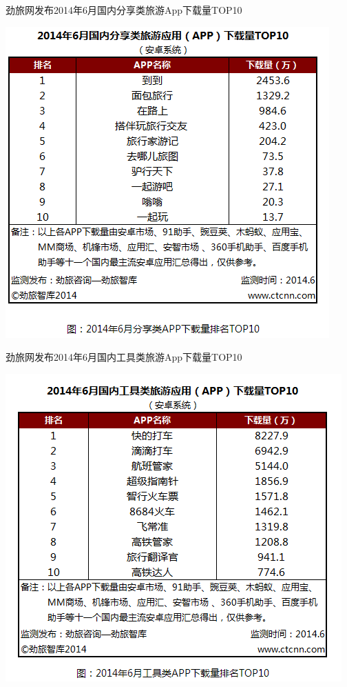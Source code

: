 \documentclass[12pt,a4paper]{article}
\begin{document}
\begin{CJK}{UTF8}{gbsn}
	劲旅网发布2014年6月国内分享类旅游App下载量TOP10
	\begin{center}
	\includegraphics[scale=0.8]{image3}
	\end{center}

	劲旅网发布2014年6月国内工具类旅游App下载量TOP10
	\begin{center}
	\includegraphics[scale=0.8]{image4}
	\end{center}


\end{CJK}
\end{document}
